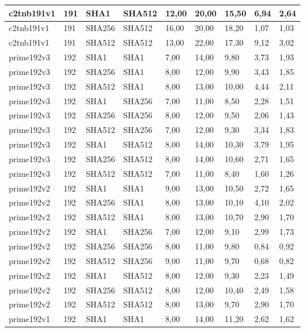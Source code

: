 \begin{longtable}{| l | l | l | l | l |l |l |l |l |}
c2tnb191v1 & 191 & SHA1 & SHA512 & 12,00 & 20,00 & 15,50 & 6,94 & 2,64 \\ \hline 
c2tnb191v1 & 191 & SHA256 & SHA512 & 16,00 & 20,00 & 18,20 & 1,07 & 1,03 \\ \hline 
c2tnb191v1 & 191 & SHA512 & SHA512 & 13,00 & 22,00 & 17,30 & 9,12 & 3,02 \\ \hline 
prime192v3 & 192 & SHA1 & SHA1 & 7,00 & 14,00 & 9,80 & 3,73 & 1,93 \\ \hline 
prime192v3 & 192 & SHA256 & SHA1 & 8,00 & 12,00 & 9,90 & 3,43 & 1,85 \\ \hline 
prime192v3 & 192 & SHA512 & SHA1 & 8,00 & 13,00 & 10,00 & 4,44 & 2,11 \\ \hline 
prime192v3 & 192 & SHA1 & SHA256 & 7,00 & 11,00 & 8,50 & 2,28 & 1,51 \\ \hline 
prime192v3 & 192 & SHA256 & SHA256 & 8,00 & 12,00 & 9,50 & 2,06 & 1,43 \\ \hline 
prime192v3 & 192 & SHA512 & SHA256 & 7,00 & 12,00 & 9,30 & 3,34 & 1,83 \\ \hline 
prime192v3 & 192 & SHA1 & SHA512 & 8,00 & 14,00 & 10,30 & 3,79 & 1,95 \\ \hline 
prime192v3 & 192 & SHA256 & SHA512 & 8,00 & 14,00 & 10,60 & 2,71 & 1,65 \\ \hline 
prime192v3 & 192 & SHA512 & SHA512 & 7,00 & 11,00 & 8,40 & 1,60 & 1,26 \\ \hline 
prime192v2 & 192 & SHA1 & SHA1 & 9,00 & 13,00 & 10,50 & 2,72 & 1,65 \\ \hline 
prime192v2 & 192 & SHA256 & SHA1 & 8,00 & 13,00 & 10,10 & 4,10 & 2,02 \\ \hline 
prime192v2 & 192 & SHA512 & SHA1 & 8,00 & 13,00 & 10,70 & 2,90 & 1,70 \\ \hline 
prime192v2 & 192 & SHA1 & SHA256 & 7,00 & 12,00 & 9,10 & 2,99 & 1,73 \\ \hline 
prime192v2 & 192 & SHA256 & SHA256 & 8,00 & 11,00 & 9,80 & 0,84 & 0,92 \\ \hline 
prime192v2 & 192 & SHA512 & SHA256 & 9,00 & 11,00 & 9,70 & 0,68 & 0,82 \\ \hline 
prime192v2 & 192 & SHA1 & SHA512 & 8,00 & 12,00 & 9,30 & 2,23 & 1,49 \\ \hline 
prime192v2 & 192 & SHA256 & SHA512 & 8,00 & 12,00 & 10,40 & 2,49 & 1,58 \\ \hline 
prime192v2 & 192 & SHA512 & SHA512 & 8,00 & 13,00 & 9,70 & 2,90 & 1,70 \\ \hline 
prime192v1 & 192 & SHA1 & SHA1 & 8,00 & 14,00 & 11,20 & 2,62 & 1,62 \\ \hline 

\end{longtable}
